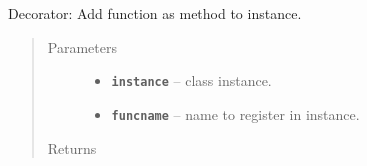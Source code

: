 \documentclass[letterpaper,10pt,english]{sphinxmanual}
\begin{document}

\begin{fulllineitems}
\label{RRtoolbox.lib:RRtoolbox.lib.root.addto}
Decorator: Add function as method to instance.
\begin{quote}\begin{description}
\item[{Parameters}] \leavevmode\begin{itemize}
\item {} 
\textbf{\texttt{instance}} -- class instance.

\item {} 
\textbf{\texttt{funcname}} -- name to register in instance.

\end{itemize}

\item[{Returns}] \leavevmode


\end{description}\end{quote}

\end{fulllineitems}

\end{document}
